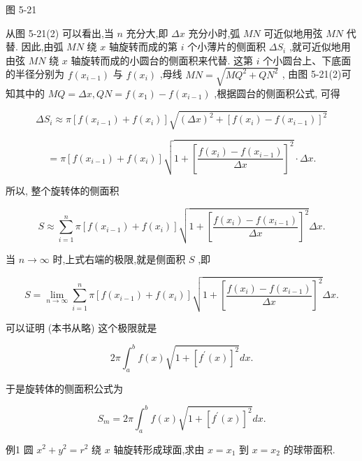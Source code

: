 \documentclass[lang=cn,newtx,12pt,scheme=chinese]{elegantbook}
\begin{document}
图 5-21

从图 5-21(2) 可以看出,当 \(n\) 充分大,即 \({\Delta x}\) 充分小时,弧 \({MN}\) 可近似地用弦 \({MN}\) 代替. 因此,由弧 \({MN}\) 绕 \(x\) 轴旋转而成的第 \(i\) 个小薄片的侧面积 \(\Delta {S}_{i}\) ,就可近似地用由弦 \({MN}\) 绕 \(x\) 轴旋转而成的小圆台的侧面积来代替. 这第 \(i\) 个小圆台上、下底面的半径分别为 \(f\left( {x}_{i - 1}\right)\) 与 \(f\left( {x}_{i}\right)\) ,母线 \({MN} = \sqrt{M{Q}^{2} + Q{N}^{2}}\) , 由图 5-21(2)可知其中的 \({MQ} = {\Delta x},{QN} = f\left( {x}_{1}\right) - f\left( {x}_{i - 1}\right)\) ,根据圆台的侧面积公式, 可得

\[
\Delta {S}_{i} \approx \pi \left\lbrack {f\left( {x}_{i - 1}\right) + f\left( {x}_{i}\right) }\right\rbrack \sqrt{{\left( \Delta x\right) }^{2} + {\left\lbrack f\left( {x}_{i}\right) - f\left( {x}_{i - 1}\right) \right\rbrack }^{2}}
\]

\[
= \pi \left\lbrack {f\left( {x}_{i - 1}\right) + f\left( {x}_{i}\right) }\right\rbrack \sqrt{1 + {\left\lbrack \frac{f\left( {x}_{i}\right) - f\left( {x}_{i - 1}\right) }{\Delta x}\right\rbrack }^{2}} \cdot {\Delta x}.
\]

所以, 整个旋转体的侧面积

\[
S \approx \mathop{\sum }\limits_{{i = 1}}^{n}\pi \left\lbrack {f\left( {x}_{i - 1}\right) + f\left( {x}_{i}\right) }\right\rbrack \sqrt{1 + {\left\lbrack \frac{f\left( {x}_{i}\right) - f\left( {x}_{i - 1}\right) }{\Delta x}\right\rbrack }^{2}}{\Delta x}.
\]

当 \(n \rightarrow \infty\) 时,上式右端的极限,就是侧面积 \(S\) ,即

\[
S = \mathop{\lim }\limits_{{n \rightarrow \infty }}\mathop{\sum }\limits_{{i = 1}}^{n}\pi \left\lbrack {f\left( {x}_{i - 1}\right) + f\left( {x}_{i}\right) }\right\rbrack \sqrt{1 + {\left\lbrack \frac{f\left( {x}_{i}\right) - f\left( {x}_{i - 1}\right) }{\Delta x}\right\rbrack }^{2}}{\Delta x}.
\]

可以证明 (本书从略) 这个极限就是

\[
{2\pi }{\int }_{a}^{b}f\left( x\right) \sqrt{1 + {\left\lbrack {f}^{\prime }\left( x\right) \right\rbrack }^{2}}{dx}.
\]

于是旋转体的侧面积公式为

\[
{S}_{m} = {2\pi }{\int }_{a}^{b}f\left( x\right) \sqrt{1 + {\left\lbrack {f}^{\prime }\left( x\right) \right\rbrack }^{2}}{dx}.
\]

例1 圆 \({x}^{2} + {y}^{2} = {r}^{2}\) 绕 \(x\) 轴旋转形成球面,求由 \(x = {x}_{1}\) 到 \(x = {x}_{2}\) 的球带面积.
\end{document}
